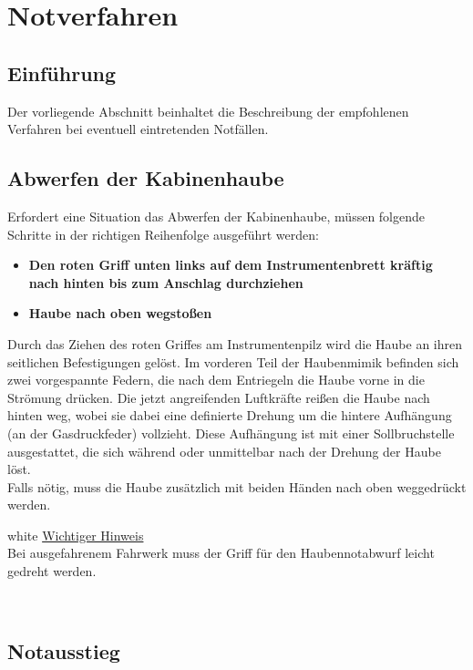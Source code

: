 \chapter{Notverfahren}
\pagecolor{red}
\section{Einführung}
Der vorliegende Abschnitt beinhaltet die Beschreibung der empfohlenen Verfahren bei eventuell eintretenden Notfällen.

\section{Abwerfen der Kabinenhaube}
Erfordert eine Situation das Abwerfen der Kabinenhaube, müssen folgende Schritte in der richtigen Reihenfolge ausgeführt werden:
\begin{itemize}
\item \textbf{Den roten Griff unten links auf dem Instrumentenbrett kräftig nach hinten bis zum Anschlag durchziehen}
\item \textbf{Haube nach oben wegstoßen}
\end{itemize}

Durch das Ziehen des roten Griffes am Instrumentenpilz wird die Haube an ihren seitlichen Befestigungen gelöst. Im vorderen Teil der Haubenmimik befinden sich zwei vorgespannte Federn, die nach dem Entriegeln die Haube vorne in die Strömung drücken. Die jetzt angreifenden Luftkräfte reißen die Haube nach hinten weg, wobei sie dabei eine definierte Drehung um die hintere Aufhängung (an der Gasdruckfeder) vollzieht. Diese Aufhängung ist mit einer Sollbruchstelle ausgestattet, die sich während oder unmittelbar nach der Drehung der Haube löst.\\
Falls nötig, muss die Haube zusätzlich mit beiden Händen nach oben weggedrückt werden.\\
\newline
\newline
\begin{color}{white}
\large{\underline{Wichtiger Hinweis}}\\
Bei ausgefahrenem Fahrwerk muss der Griff für den Haubennotabwurf leicht gedreht werden.
\end{color}\\


\section{Notausstieg}

